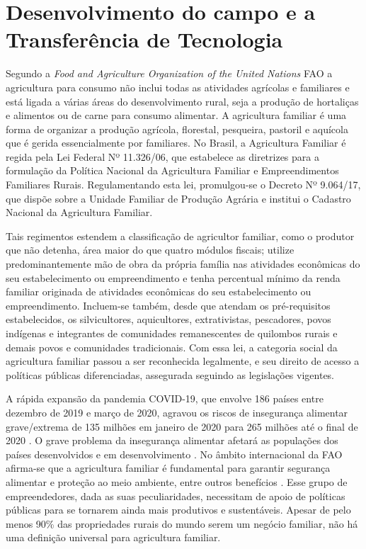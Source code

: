\section{Desenvolvimento do campo e a Transferência de Tecnologia}

Segundo a \textit{Food and Agriculture Organization of the United Nations} FAO \cite{fao_panorama_2017} a agricultura para consumo não inclui todas as atividades agrícolas e familiares e está ligada a várias áreas do desenvolvimento rural, seja  a produção de hortaliças e alimentos ou de carne para consumo alimentar. A agricultura familiar é uma forma de organizar a produção agrícola, florestal, pesqueira, pastoril e aquícola que é gerida essencialmente por familiares. No Brasil, a Agricultura Familiar é regida pela Lei Federal Nº 11.326/06, que estabelece as diretrizes para a formulação da Política Nacional da Agricultura Familiar e Empreendimentos Familiares Rurais. Regulamentando esta lei, promulgou-se o Decreto Nº 9.064/17, que dispõe sobre a Unidade Familiar de Produção Agrária e institui o Cadastro Nacional da Agricultura Familiar. 

Tais regimentos estendem a classificação de agricultor familiar, como o produtor que não detenha, área maior do que quatro módulos fiscais; utilize predominantemente mão de obra da própria família nas atividades econômicas do seu estabelecimento ou empreendimento e tenha percentual mínimo da renda familiar originada de atividades econômicas do seu estabelecimento ou empreendimento. Incluem-se também, desde que atendam os pré-requisitos estabelecidos, os silvicultores, aquicultores, extrativistas, pescadores, povos indígenas e integrantes de comunidades remanescentes de quilombos rurais e demais povos e comunidades tradicionais. Com essa lei, a categoria social da agricultura familiar passou a ser reconhecida legalmente, e seu direito de acesso a políticas públicas diferenciadas, assegurada seguindo as legislações vigentes.

A rápida expansão da pandemia COVID-19, que envolve 186 países entre dezembro de 2019 e março de 2020, agravou os riscos de insegurança alimentar grave/extrema de 135 milhões em janeiro de 2020 para 265 milhões até o final de 2020 \cite{dongyu_senior_2020}. O grave problema da insegurança alimentar afetará as populações dos países desenvolvidos e em desenvolvimento \cite{lal_home_2020}. No âmbito internacional da FAO afirma-se que a agricultura familiar é fundamental para garantir segurança alimentar e proteção ao meio ambiente, entre outros benefícios \cite{fao_panorama_2017}. Esse grupo de empreendedores, dada as suas peculiaridades, necessitam de apoio de políticas públicas para se tornarem ainda mais produtivos e sustentáveis. Apesar de pelo menos 90\% das propriedades rurais do mundo serem um negócio familiar, não há uma definição universal para agricultura familiar.

